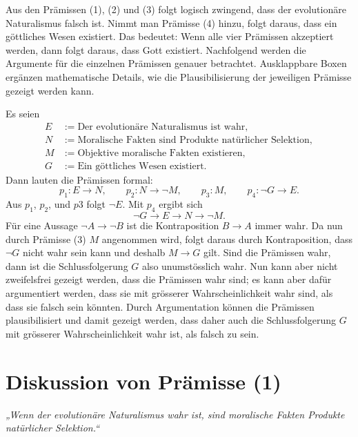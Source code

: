 \documentclass[11pt,a4paper]{article}
\begin{document}
	Aus den Prämissen (1), (2) und (3) folgt logisch zwingend, dass der evolutionäre Naturalismus falsch ist. Nimmt man Prämisse (4) hinzu, folgt daraus, dass ein göttliches Wesen existiert. Das bedeutet: Wenn alle vier Prämissen akzeptiert werden, dann folgt daraus, dass Gott existiert. Nachfolgend werden die Argumente für die einzelnen Prämissen genauer betrachtet. Ausklappbare Boxen ergänzen mathematische Details, wie die Plausibilisierung der jeweiligen Prämisse gezeigt werden kann.
	
	\begin{tcolorbox}[title=Mathematik-Box: Die logische Struktur des Arguments]
		Es seien
		\[
		\begin{aligned}
			E &:= \text{Der evolutionäre Naturalismus ist wahr},\\
			N &:= \text{Moralische Fakten sind Produkte natürlicher Selektion},\\
			M &:= \text{Objektive moralische Fakten existieren},\\
			G &:= \text{Ein göttliches Wesen existiert}.
		\end{aligned}
		\]
		Dann lauten die Prämissen formal:
		\[
		p_1:E\rightarrow N,\qquad
		p_2:N\rightarrow\neg M,\qquad
		p_3:M,\qquad
		p_4:\neg G\rightarrow E.
		\]
		Aus $p_1$, $p_2$, und $p3$ folgt  \(\neg E\). Mit \(p_4\) ergibt sich
		\[
		\neg G\rightarrow E\rightarrow N\rightarrow\neg M.
		\]
		Für eine Aussage $\neg A \rightarrow \neg B$ ist die Kontraposition $B \rightarrow A$ immer wahr. Da nun durch Prämisse (3) \(M\) angenommen wird, folgt daraus durch Kontraposition, dass \(\neg G\) nicht wahr sein kann und deshalb
		\( M \rightarrow G\) gilt. Sind die Prämissen wahr, dann ist die Schlussfolgerung $G$ also unumstösslich wahr. Nun kann aber nicht zweifelsfrei gezeigt werden, dass die Prämissen wahr sind; es kann aber dafür argumentiert werden, dass sie mit grösserer Wahrscheinlichkeit wahr sind, als dass sie falsch sein könnten. Durch Argumentation können die Prämissen plausibilisiert und damit gezeigt werden, dass daher auch die Schlussfolgerung $G$ mit grösserer Wahrscheinlichkeit wahr ist, als falsch zu sein.
	\end{tcolorbox}
	
	\section{Diskussion von Prämisse (1)}
	
	\textit{„Wenn der evolutionäre Naturalismus wahr ist, sind moralische Fakten Produkte natürlicher Selektion.“}
	
\end{document}
